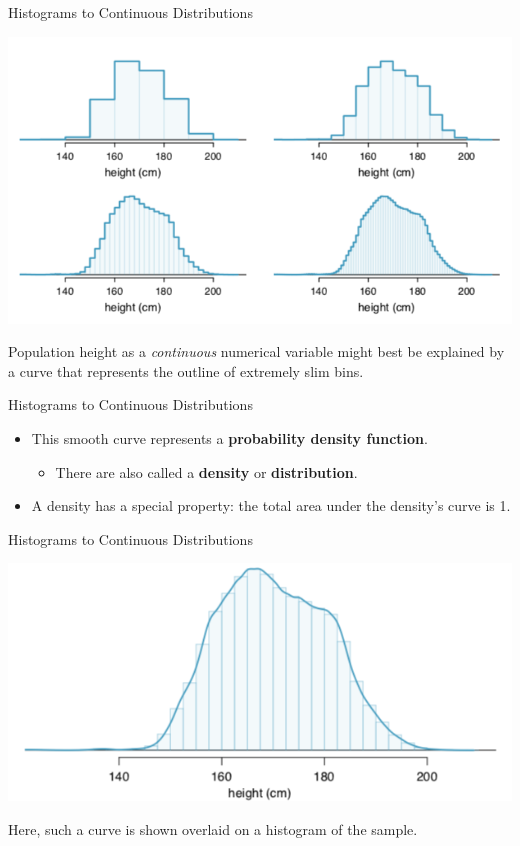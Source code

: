 \begin{frame}{Histograms to Continuous Distributions}
    \begin{center}
        \includegraphics[scale=0.4]{images/hists.png}
    \end{center}
    \vspace{-12pt}Population height as a \textit{continuous} numerical variable might best be explained by a curve that represents the outline of extremely slim bins.
\end{frame}

\begin{frame}{Histograms to Continuous Distributions}
    \begin{itemize}
        \item This smooth curve represents a \textbf{probability density function}.
        \begin{itemize}
            \item There are also called a \textbf{density} or \textbf{distribution}.
        \end{itemize}
        \item A density has a special property: the total area under the density’s curve is 1.
    \end{itemize}
\end{frame}

\begin{frame}{Histograms to Continuous Distributions}
    \begin{center}
        \includegraphics[scale=0.5]{images/heighthistdist.png}
    \end{center}
    Here, such a curve is shown overlaid on a histogram of the sample. 
\end{frame}

